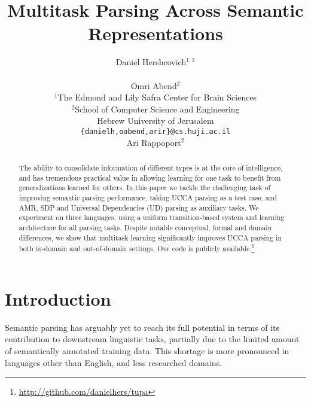 \documentclass[11pt,a4paper]{article}
\title{Multitask Parsing Across Semantic Representations}
\author{Daniel Hershcovich$^{1,2}$ \\
  \\\And
  Omri Abend$^2$ \\
  $^1$The Edmond and Lily Safra Center for Brain Sciences \\
  $^2$School of Computer Science and Engineering \\
  Hebrew University of Jerusalem \\
  \texttt{\{danielh,oabend,arir\}@cs.huji.ac.il}
  \\\And
  Ari Rappoport$^2$
}
\date{}
\begin{document}
\maketitle

\begin{abstract}
  The ability to consolidate information of different types
  is at the core of intelligence, and has tremendous practical value
  in allowing learning for one task to benefit from generalizations learned for others.
  In this paper we
  tackle the challenging task of improving semantic parsing
  performance, taking UCCA
  parsing as a test case, 
  and AMR, SDP and Universal Dependencies (UD) parsing as auxiliary tasks.
  We experiment on three languages,
  using a uniform transition-based system and learning 
  architecture for all parsing tasks.
  Despite notable conceptual, formal and domain differences,
  we show that multitask learning significantly improves UCCA parsing
  in both in-domain and out-of-domain settings.
  Our code is publicly available.\footnote{\url{http://github.com/danielhers/tupa}}
\end{abstract}

\section{Introduction}\label{sec:introduction}

Semantic parsing has arguably yet to reach its full 
potential in terms of its contribution to downstream linguistic tasks,
partially due to the limited amount of semantically annotated training data.
This shortage is more pronounced in 
languages other than English, and less researched domains.

\end{document}
